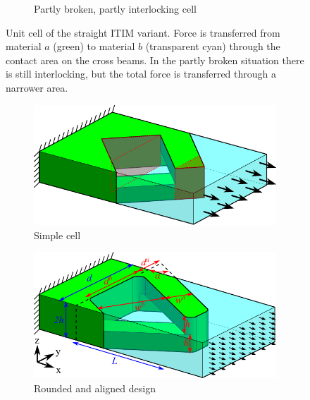 \begin{figure}
\begin{subfigure}[B]{.33\textwidth}
		\caption{Partly broken, partly interlocking cell}
		\label{interlocking:fig:straight_model_broken}
	\end{subfigure}
	\caption{Unit cell of the straight ITIM variant. Force is transferred from material $a$ (green) to material $b$ (transparent cyan) through the contact area on the cross beams. In the partly broken situation there is still interlocking, but the total force is transferred through a narrower area.}
\end{figure}

\begin{figure}
	\centering
	\begin{subfigure}[B]{.25\textwidth}
		\centering
		\includegraphics{sources-method-diagonal_model_simple_v5.pdf}
		\caption{Simple cell}
		\label{interlocking:fig:diagonal_model_simple}
	\end{subfigure}
	\begin{subfigure}[B]{.33\textwidth}
		\centering
		\includegraphics{sources-method-diagonal_model_v5_no_failures.pdf}
		\caption{Rounded and aligned design}
		\label{interlocking:fig:diagonal_model}
	\end{subfigure}
	\begin{subfigure}[B]{.33\textwidth}
		\centering

\end{subfigure}
\end{figure}
